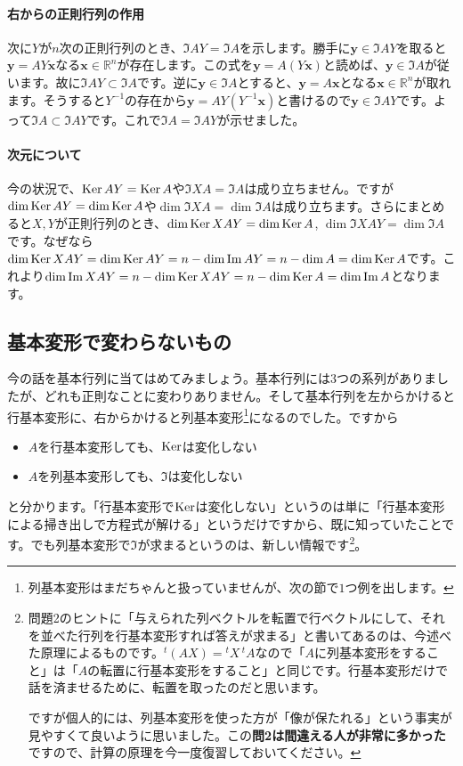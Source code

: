 
\paragraph{右からの正則行列の作用}

次に$Y$が$n$次の正則行列のとき、$\Im AY = \Im A$を示します。勝手に$\bm{y} \in \Im AY$を取ると$\bm{y} = AY\bm{x}$なる$\bm{x} \in \mathbb{R}^n$が存在します。この式を$\bm{y} = A(Y\bm{x})$と読めば、$\bm{y} \in \Im A$が従います。故に$\Im AY \subset \Im A$です。逆に$\bm{y} \in \Im A$とすると、$\bm{y} = A\bm{x}$となる$\bm{x} \in  \mathbb{R}^n$が取れます。そうすると$Y^{-1}$の存在から$\bm{y} = AY(Y^{-1}\bm{x})$と書けるので$\bm{y} \in \Im AY$です。よって$\Im A \subset \Im AY$です。これで$\Im A = \Im AY$が示せました。


\paragraph{次元について} 今の状況で、$\operatorname{Ker} AY = \operatorname{Ker} A$や$\Im XA = \Im A$は成り立ちません。ですが$\dim \operatorname{Ker} AY = \dim \operatorname{Ker} A$や$\dim \Im XA = \dim \Im A$は成り立ちます。さらにまとめると$X, Y$が正則行列のとき、$\dim \operatorname{Ker} XAY = \dim \operatorname{Ker} A$, $\dim \Im XAY = \dim \Im A$です。なぜなら$\dim \operatorname{Ker} XAY = \dim \operatorname{Ker} AY = n - \dim \mathrm{Im}\, AY = n - \dim A = \dim \operatorname{Ker} A$です。これより$\dim \mathrm{Im}\, XAY = n - \dim \operatorname{Ker} XAY = n - \dim \operatorname{Ker} A = \dim \mathrm{Im}\, A$となります。

\subsection{基本変形で変わらないもの}

今の話を基本行列に当てはめてみましょう。基本行列には$3$つの系列がありましたが、どれも正則なことに変わりありません。そして基本行列を左からかけると行基本変形に、右からかけると列基本変形\footnote{列基本変形はまだちゃんと扱っていませんが、次の節で$1$つ例を出します。}になるのでした。ですから
\begin{itemize}
\item $A$を行基本変形しても、$\operatorname{Ker}$は変化しない
\item $A$を列基本変形しても、$\Im$は変化しない
\end{itemize}
と分かります。「行基本変形で$\operatorname{Ker}$は変化しない」というのは単に「行基本変形による掃き出しで方程式が解ける」というだけですから、既に知っていたことです。でも列基本変形で$\Im$が求まるというのは、新しい情報です\footnote{問題2のヒントに「与えられた列ベクトルを転置で行ベクトルにして、それを並べた行列を行基本変形すれば答えが求まる」と書いてあるのは、今述べた原理によるものです。${}^t(AX) = {}^t\! X\, {}^t\! A$なので「$A$に列基本変形をすること」は「$A$の転置に行基本変形をすること」と同じです。行基本変形だけで話を済ませるために、転置を取ったのだと思います。

ですが個人的には、列基本変形を使った方が「像が保たれる」という事実が見やすくて良いように思いました。この\textbf{問2は間違える人が非常に多かった}ですので、計算の原理を今一度復習しておいてください。}。

